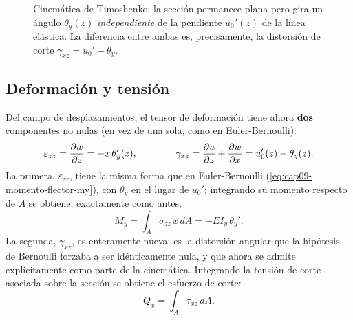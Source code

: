 \begin{figure}[htbp]
\centering
{}
\caption{Cinemática de Timoshenko: la sección permanece plana pero gira un ángulo $\theta_y(z)$ \emph{independiente} de la pendiente $u_0'(z)$ de la línea elástica. La diferencia entre ambas es, precisamente, la distorsión de corte $\gamma_{xz}=u_0'-\theta_y$.}
\label{fig:cap12-cinematica-timoshenko}
\end{figure}

\subsection{Deformación y tensión}

Del campo de desplazamientos, el tensor de deformación tiene ahora \textbf{dos} componentes no nulas (en vez de una sola, como en Euler-Bernoulli):
\[
\varepsilon_{zz} = \pdv{w}{z} = -x\,\theta_y'(z), \qquad\qquad
\gamma_{xz} = \pdv{u}{z}+\pdv{w}{x} = u_0'(z) - \theta_y(z) .
\]
La primera, $\varepsilon_{zz}$, tiene la misma forma que en Euler-Bernoulli (\cref{eq:cap09-momento-flector-my}), con $\theta_y$ en el lugar de $u_0'$; integrando su momento respecto de $A$ se obtiene, exactamente como antes,
\[
M_y = \int_A \sigma_{zz}\,x\,dA = -EI_y\,\theta_y' .
\]
La segunda, $\gamma_{xz}$, es enteramente nueva: es la distorsión angular que la hipótesis de Bernoulli forzaba a ser idénticamente nula, y que ahora se admite explícitamente como parte de la cinemática. Integrando la tensión de corte asociada sobre la sección se obtiene el esfuerzo de corte:
\[
Q_x = \int_A \tau_{xz}\,dA .
\]

